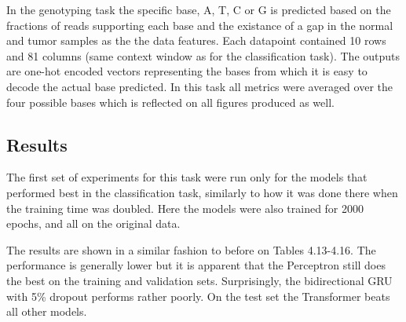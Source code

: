 \documentclass[bsc,frontabs,singlespacing,parskip,deptreport]{infthesis}
\begin{document}
In the genotyping task the specific base, A, T, C or G is predicted based on the fractions of reads supporting each base and the existance of a gap in the normal and tumor samples as the the data features. Each datapoint contained 10 rows and 81 columns (same context window as for the classification task). The outputs are one-hot encoded vectors representing the bases from which it is easy to decode the actual base predicted. In this task all metrics were averaged over the four possible bases which is reflected on all figures produced as well.

\subsection{Results}

The first set of experiments for this task were run only for the models that performed best in the classification task, similarly to how it was done there when the training time was doubled. Here the models were also trained for 2000 epochs, and all on the original data.

The results are shown in a similar fashion to before on Tables 4.13-4.16. The performance is generally lower but it is apparent that the Perceptron still does the best on the training and validation sets. Surprisingly, the bidirectional GRU with 5\% dropout performs rather poorly. On the test set the Transformer beats all other models.

\begin{table}
\begin{center}
\caption{Genotyping task training set results}
\end{center}
\vskip -5mm
\end{table}
\end{document}
